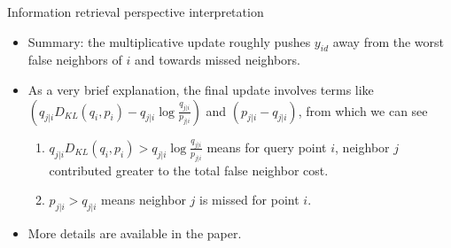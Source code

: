 \documentclass[first=dgreen,second=purple,logo=yellowexc]{aaltoslides}
\begin{document}
\begin{frame}{Information retrieval perspective interpretation}
\begin{itemize}
\item Summary: the multiplicative update roughly pushes $y_{id}$ away from the worst false neighbors of $i$ and towards missed neighbors.
\item As a very brief explanation, the final update involves terms like $(q_{j|i}D_{KL}(q_i,p_i)-q_{j|i}\log\frac{q_{j|i}}{p_{j|i}})$ and $(p_{j|i}-q_{j|i})$, from which we can see
\begin{enumerate}
\item $q_{j|i}D_{KL}(q_i,p_i)>q_{j|i}\log\frac{q_{j|i}}{p_{j|i}}$ means for query point $i$, neighbor $j$ contributed greater to the total false neighbor cost.
\item $p_{j|i}>q_{j|i}$ means neighbor $j$ is missed for point $i$.
\end{enumerate}
\item More details are available in the paper.
\end{itemize}
\end{frame}
\end{document}
